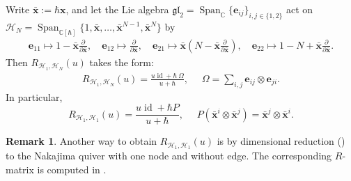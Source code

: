 \documentclass[10pt]{amsart}
\theoremstyle{definition}
\newtheorem{Remark}[Theorem]{Remark}
\numberwithin{equation}{section}
\newcommand{\bC}{\mathbb{C}}
\newcommand{\Span}{\operatorname{Span}}
\newcommand{\id}{\operatorname{id}}
\begin{document}
Write $\bar{\mathbf x}:=\hbar\mathbf x$, and let the Lie algebra $\mathfrak{gl}_2=\Span_\bC\{\mathbf e_{ij}\}_{i,j\in \{1,2\}}$ act on $\mathcal H_N=\Span_{\bC[\hbar]}\{1,\bar{\mathbf x},\ldots,\bar{\mathbf x}^{N-1},\bar{\mathbf x}^N\}$ by
\begin{align*}
    \mathbf e_{11}\mapsto 1-\bar{\mathbf x}\frac{\partial}{\partial \bar{\mathbf x}},\quad  \mathbf e_{12}\mapsto \frac{\partial}{\partial \bar{\mathbf x}} ,\quad  \mathbf e_{21}\mapsto \bar{\mathbf x}\left(N-\bar{\mathbf x} \frac{\partial}{\partial \bar{\mathbf x}}\right),\quad \mathbf e_{22}\mapsto 1-N+\bar{\mathbf x} \frac{\partial}{\partial \bar{\mathbf x}}.
\end{align*}
Then $R_{\mathcal H_1,\mathcal H_N}(u)$ takes the form:
\begin{align}\label{R(H_1,H_N)}
    R_{\mathcal H_1,\mathcal H_N}(u)=\frac{u\id+\hbar\:\Omega}{u+\hbar},\quad\,\, \Omega=\sum_{i,j}\mathbf e_{ij}\otimes \mathbf e_{ji}.
\end{align}
In particular, 
\begin{equation}\label{equ on RH1H1}
    R_{\mathcal H_1,\mathcal H_1}(u)=\frac{u\id+\hbar P}{u+\hbar},\quad \, \, P(\bar{\mathbf x}^i\otimes \bar{\mathbf x}^j)=\bar{\mathbf x}^j\otimes \bar{\mathbf x}^i.
\end{equation}


\begin{Remark}
Another way to obtain $R_{\mathcal H_1,\mathcal H_1}(u)$ is by dimensional reduction (\cite[Thm.~6.10]{COZZ}) to the Nakajima quiver with one node and without edge. The corresponding $R$-matrix is computed in \cite[\S4.1.2]{MO}.
\end{Remark}
\end{document}
